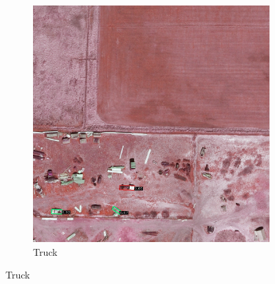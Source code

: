 \begin{figure}[h!]
\begin{subfigure}[t]{0.38\textwidth}
        \includegraphics[width=\linewidth]{images/015Results/02perm_exp/comp_images/rgir/212.png}
        \caption{Truck}
    \end{subfigure}
    

\end{figure}
